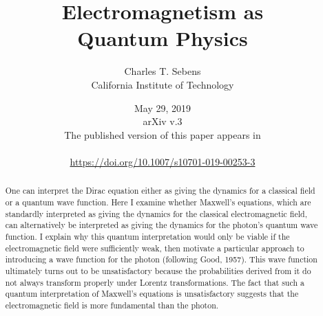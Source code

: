 \documentclass[12pt,secnumarabic,amsmath,amssymb,balancelastpage,nofootinbib]{article}
\begin{document}
\sloppy %




\title{\vspace*{-35 pt}\Huge{Electromagnetism as\\Quantum Physics}}
\author{Charles T. Sebens\\California Institute of Technology}
\date{May 29, 2019\\ arXiv v.3\\\vspace*{6 pt} {\normalsize The published version of this paper appears in} \\  \\{\small\url{https://doi.org/10.1007/s10701-019-00253-3}}}


\maketitle
\vspace*{-20 pt}
\begin{abstract}
One can interpret the Dirac equation either as giving the dynamics for a classical field or a quantum wave function.  Here I examine whether Maxwell's equations, which are standardly interpreted as giving the dynamics for the classical electromagnetic field, can alternatively be interpreted as giving the dynamics for the photon's quantum wave function.  I explain why this quantum interpretation would only be viable if the electromagnetic field were sufficiently weak, then motivate a particular approach to introducing a wave function for the photon (following Good, 1957).  This wave function ultimately turns out to be unsatisfactory because the probabilities derived from it do not always transform properly under Lorentz transformations.  The fact that such a quantum interpretation of Maxwell's equations is unsatisfactory suggests that the electromagnetic field is more fundamental than the photon.
\end{abstract}
\end{document}
